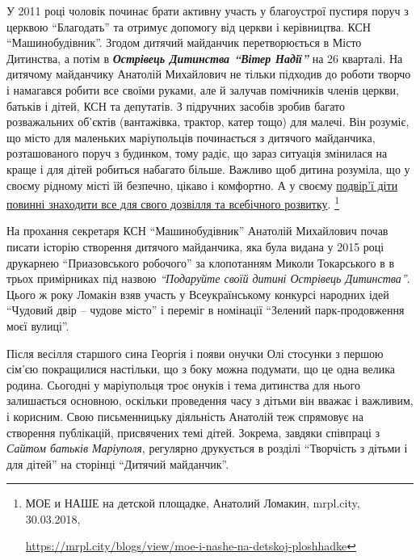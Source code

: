 У 2011 році чоловік починає брати активну участь у благоустрої пустиря поруч з
церквою \enquote{Благодать} та отримує допомогу від церкви і керівництва. КСН
\enquote{Машинобудівник}. Згодом дитячий майданчик перетворюється в Місто Дитинства, а
потім в \emph{\textbf{Острівець Дитинства \enquote{Вітер Надії}}} на 26 кварталі. На дитячому
майданчику Анатолій Михайлович не тільки підходив до роботи творчо і намагався
робити все своїми руками, але й залучав помічників членів церкви, батьків і
дітей, КСН та депутатів. З підручних засобів зробив багато розважальних
об'єктів (вантажівка, трактор, катер тощо) для малечі. Він розуміє, що місто
для маленьких маріупольців починається з дитячого майданчика, розташованого
поруч з будинком, тому радіє, що зараз ситуація змінилася на краще і для дітей
робиться набагато більше. Важливо щоб дитина розуміла, що у своєму рідному
місті їй безпечно, цікаво і комфортно. А у своєму \href{https://mrpl.city/blogs/view/moe-i-nashe-na-detskoj-ploshhadke}{%
подвір'ї діти повинні знаходити все для свого дозвілля та всебічного розвитку}.%
\footnote{МОЕ и НАШЕ на детской площадке, Анатолий Ломакин, mrpl.city, 30.03.2018, \par%
\url{https://mrpl.city/blogs/view/moe-i-nashe-na-detskoj-ploshhadke}
}

На прохання секретаря КСН \enquote{Машинобудівник} Анатолій Михайлович почав писати
історію створення дитячого майданчика, яка була видана у 2015 році друкарнею
\enquote{Приазовського робочого} за клопотанням Миколи Токарського в в трьох
примірниках під назвою \emph{\enquote{Подаруйте своїй дитині Острівець Дитинства}}. Цього ж
року Ломакін взяв участь у Всеукраїнському конкурсі народних ідей \enquote{Чудовий двір
– чудове місто} і переміг в номінації \enquote{Зелений парк-продовження моєї вулиці}.


Після весілля старшого сина Георгія і появи онучки Олі стосунки з першою сім'єю
покращилися настільки, що з боку можна подумати, що це одна велика родина.
Сьогодні у маріупольця троє онуків і тема дитинства для нього залишається
основною, оскільки проведення часу з дітьми він вважає і важливим, і корисним.
Свою письменницьку діяльність Анатолій теж спрямовує на створення публікацій,
присвячених темі дітей. Зокрема, завдяки співпраці з \emph{Сайтом батьків Маріуполя},
регулярно друкується в розділі \enquote{Творчість з дітьми і для дітей} на сторінці
\enquote{Дитячий майданчик}.

